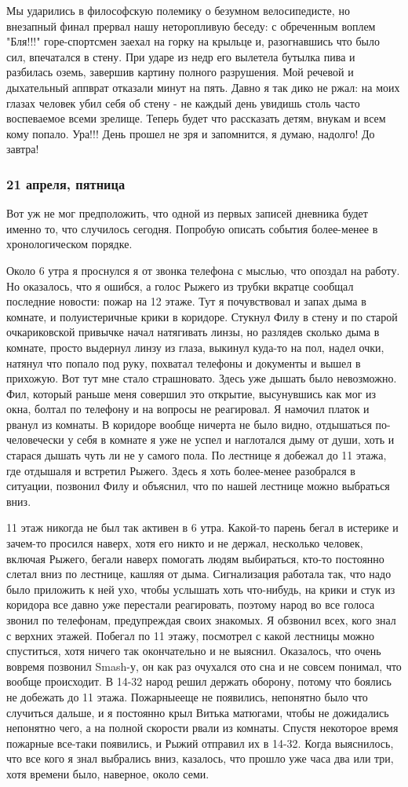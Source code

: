 \documentclass[12pt,a4paper]{article}
\newcommand{\ssubsection}[1]{
	\subsubsection*{#1}
	\addcontentsline{toc}{subsubsection}{#1}
}
\begin{document}
Мы ударились в философскую полемику о безумном велосипедисте, но внезапный финал прервал нашу неторопливую беседу: с обреченным воплем "Бля!!!" горе-спортсмен заехал на горку на крыльце и, разогнавшись что было сил, впечатался в стену. При ударе из недр его вылетела бутылка пива и разбилась оземь, завершив картину полного разрушения. Мой речевой и дыхательный аппврат отказали минут на пять. Давно я так дико не ржал: на моих глазах человек убил себя об стену - не каждый день увидишь столь часто воспеваемое всеми зрелище. Теперь будет что рассказать детям, внукам и всем кому попало. Ура!!! День прошел не зря и запомнится, я думаю, надолго! До завтра!

\ssubsection{21 апреля, пятница}
Вот уж не мог предположить, что одной из первых записей дневника будет именно то, что случилось сегодня. Попробую описать события более-менее в хронологическом порядке.

Около 6 утра я проснулся я от звонка телефона с мыслью, что опоздал на работу. Но оказалось, что я ошибся, а голос Рыжего из трубки вкратце сообщал последние новости: пожар на 12 этаже. Тут я почувствовал и запах дыма в комнате, и полуистеричные крики в коридоре. Стукнул Филу в стену и по старой очкариковской привычке начал натягивать линзы, но разлядев сколько дыма в комнате, просто выдернул линзу из глаза, выкинул куда-то на пол, надел очки, натянул что попало под руку, похватал телефоны и документы и вышел в прихожую. Вот тут мне стало страшновато. Здесь уже дышать было невозможно. Фил, который раньше меня совершил это открытие, высунувшись как мог из окна, болтал по телефону и на вопросы не реагировал. Я намочил платок и рванул из комнаты. В коридоре вообще ничерта не было видно, отдышаться по-человечески у себя в комнате я уже не успел и наглотался дыму от души, хоть и старася дышать чуть ли не у самого пола. По лестнице я добежал до 11 этажа, где отдышаля и встретил Рыжего. Здесь я хоть более-менее разобрался в ситуации, позвонил Филу и объяснил, что по нашей лестнице можно выбраться вниз.

11 этаж никогда не был так активен в 6 утра. Какой-то парень бегал в истерике и зачем-то просился наверх, хотя его никто и не держал, несколько человек, включая Рыжего, бегали наверх помогать людям выбираться, кто-то постоянно слетал вниз по лестнице, кашляя от дыма. Сигнализация работала так, что надо было приложить к ней ухо, чтобы услышать хоть что-нибудь, на крики и стук из коридора все давно уже перестали реагировать, поэтому народ во все голоса звонил по телефонам, предупреждая своих знакомых. Я обзвонил всех, кого знал с верхних этажей. Побегал по 11 этажу, посмотрел с какой лестницы можно спуститься, хотя ничего так окончательно и не выяснил. Оказалось, что очень вовремя позвонил Smash-у, он как раз очухался ото сна и не совсем понимал, что вообще происходит. В 14-32 народ решил держать оборону, потому что боялись не добежать до 11 этажа. Пожарныееще не появились, непонятно было что случиться дальше, и я постоянно крыл Витька матюгами, чтобы не дожидались непонятно чего, а на полной скорости рвали из комнаты. Спустя некоторое время пожарные все-таки появились, и Рыжий отправил их в 14-32. Когда выяснилось, что все кого я знал выбрались вниз, казалось, что прошло уже часа два или три, хотя времени было, наверное, около семи. 
\end{document}
